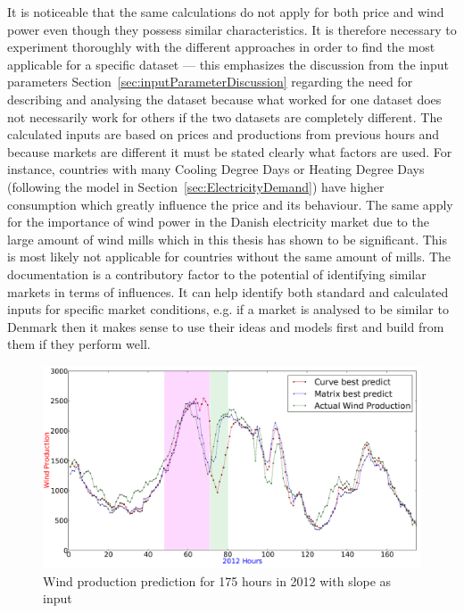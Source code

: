 It is noticeable that the same calculations do not apply for both price and wind power even though they possess similar characteristics. It is therefore necessary to experiment thoroughly with the different approaches in order to find the most applicable for a specific dataset --- this emphasizes the discussion from the input parameters Section~\ref{sec:inputParameterDiscussion} regarding the need for describing and analysing the dataset because what worked for one dataset does not necessarily work for others if the two datasets are completely different. The calculated inputs are based on prices and productions from previous hours and because markets are different it must be stated clearly what factors are used. For instance, countries with many Cooling Degree Days or Heating Degree Days (following the model in Section~\ref{sec:ElectricityDemand}) have higher consumption which greatly influence the price and its behaviour. The same apply for the importance of wind power in the Danish electricity market due to the large amount of wind mills which in this thesis has shown to be significant. This is most likely not applicable for countries without the same amount of mills. The documentation is a contributory factor to the potential of identifying similar markets in terms of influences. It can help identify both standard and calculated inputs for specific market conditions, e.g. if a market is analysed to be similar to Denmark then it makes sense to use their ideas and models first and build from them if they perform well.

\begin{figure}[H]
\centering
\includegraphics[width=0.99\linewidth]{billeder/curveAnalysisWindProduction.png}
\caption{Wind production prediction for 175 hours in 2012 with slope as input}
\label{fig:basicCurveAnalysisGraphoForDiscussion}
\end{figure}

